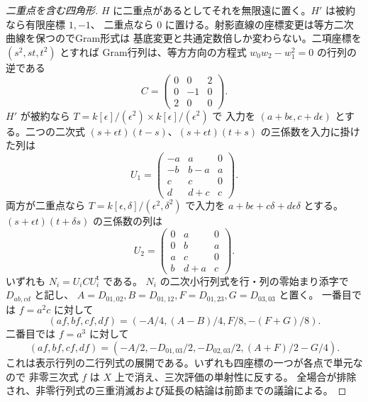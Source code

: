 \begin{proof}[二重点を含む四角形]
$H$ に二重点があるとしてそれを無限遠に置く。$H'$ は被約なら有限座標 $1,-1$、
二重点なら $0$ に置ける。射影直線の座標変更は等方二次曲線を保つのでGram形式は
基底変更と共通定数倍しか変わらない。二項座標を $(s^2,st,t^2)$ とすれば
Gram行列は、等方方向の方程式 $w_0w_2-w_1^2=0$ の行列の逆である
\[
       C=\begin{pmatrix}0&0&2\\0&-1&0\\2&0&0\end{pmatrix}.
\]
$H'$ が被約なら $T=k[\epsilon]/(\epsilon^2)\times k[\epsilon]/(\epsilon^2)$ で
入力を $(a+b\epsilon,c+d\epsilon)$ とする。二つの二次式
$(s+\epsilon t)(t-s)$、$(s+\epsilon t)(t+s)$ の三係数を入力に掛けた列は
\[
 U_1=\begin{pmatrix}-a&a&0\\-b&b-a&a\\c&c&0\\d&d+c&c\end{pmatrix}.
\]
両方が二重点なら $T=k[\epsilon,\delta]/(\epsilon^2,\delta^2)$ で入力を
$a+b\epsilon+c\delta+d\epsilon\delta$ とする。
$(s+\epsilon t)(t+\delta s)$ の三係数の列は
\[
 U_2=\begin{pmatrix}0&a&0\\0&b&a\\a&c&0\\b&d+a&c\end{pmatrix}.
\]
いずれも $N_i=U_i C U_i^{\mathsf t}$ である。
$N_i$ の二次小行列式を行・列の零始まり添字で $D_{ab,cd}$ と記し、
$A=D_{01,02}, B=D_{01,12}, F=D_{01,23}, G=D_{03,03}$ と置く。
一番目では $f=a^2c$ に対して
\[
 (af,bf,cf,df)=(-A/4,(A-B)/4,F/8,-(F+G)/8).
\]
二番目では $f=a^3$ に対して
\[
 (af,bf,cf,df)=(-A/2,-D_{01,03}/2,-D_{02,03}/2,(A+F)/2-G/4).
\]
これは表示行列の二行列式の展開である。いずれも四座標の一つが各点で単元なので
非零三次式 $f$ は $X$ 上で消え、三次評価の単射性に反する。
全場合が排除され、非零行列式の三重消滅および延長の結論は前節までの議論による。
\end{proof}
